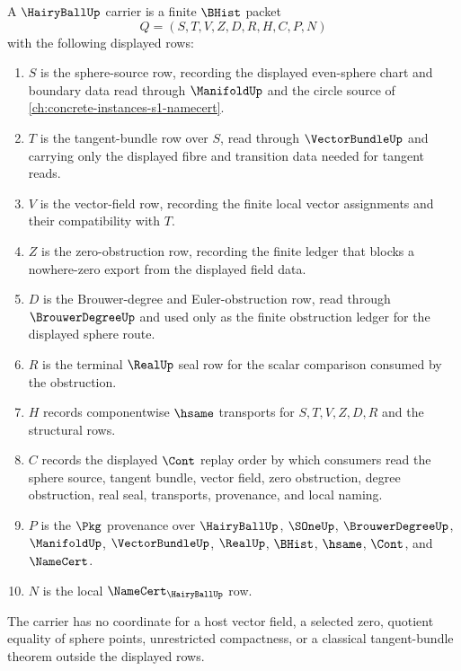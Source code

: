 \begin{definition}
\label{def:hairy-ball-carrier}
A $\HairyBallUp$ carrier is a finite $\BHist$ packet
$$
Q=(S,T,V,Z,D,R,H,C,P,N)
$$
with the following displayed rows:
\begin{enumerate}
\item $S$ is the sphere-source row, recording the displayed even-sphere chart and boundary data read through $\ManifoldUp$ and the circle source of \autoref{ch:concrete-instances-s1-namecert}.
\item $T$ is the tangent-bundle row over $S$, read through $\VectorBundleUp$ and carrying only the displayed fibre and transition data needed for tangent reads.
\item $V$ is the vector-field row, recording the finite local vector assignments and their compatibility with $T$.
\item $Z$ is the zero-obstruction row, recording the finite ledger that blocks a nowhere-zero export from the displayed field data.
\item $D$ is the Brouwer-degree and Euler-obstruction row, read through $\BrouwerDegreeUp$ and used only as the finite obstruction ledger for the displayed sphere route.
\item $R$ is the terminal $\RealUp$ seal row for the scalar comparison consumed by the obstruction.
\item $H$ records componentwise $\hsame$ transports for $S,T,V,Z,D,R$ and the structural rows.
\item $C$ records the displayed $\Cont$ replay order by which consumers read the sphere source, tangent bundle, vector field, zero obstruction, degree obstruction, real seal, transports, provenance, and local naming.
\item $P$ is the $\Pkg$ provenance over $\HairyBallUp$, $\SOneUp$, $\BrouwerDegreeUp$, $\ManifoldUp$, $\VectorBundleUp$, $\RealUp$, $\BHist$, $\hsame$, $\Cont$, and $\NameCert$.
\item $N$ is the local $\NameCert_{\HairyBallUp}$ row.
\end{enumerate}
The carrier has no coordinate for a host vector field, a selected zero, quotient equality of sphere points, unrestricted compactness, or a classical tangent-bundle theorem outside the displayed rows.
\end{definition}

